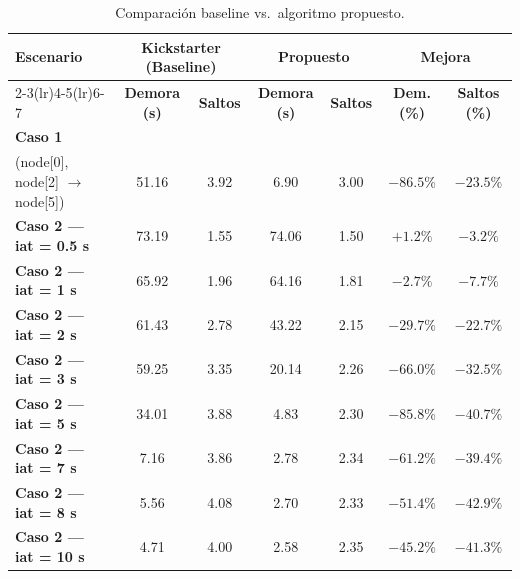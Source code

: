 \documentclass[10pt,letterpaper,twocolumn]{article}
\begin{document}
\begin{table}[!t]
  \centering
  \caption{Comparación baseline vs.\ algoritmo propuesto.}
  \label{tab:comparacion}
  \begin{tabular}{@{}lcccccc@{}}
    \toprule
    \multirow{2}{*}{\textbf{Escenario}} &
    \multicolumn{2}{c}{\textbf{Kickstarter (Baseline)}} &
    \multicolumn{2}{c}{\textbf{Propuesto}} &
    \multicolumn{2}{c}{\textbf{Mejora}} \\
    \cmidrule(lr){2-3}\cmidrule(lr){4-5}\cmidrule(lr){6-7}
    & \textbf{Demora (s)} & \textbf{Saltos} & \textbf{Demora (s)} & \textbf{Saltos} & \textbf{Dem. (\%)} & \textbf{Saltos (\%)} \\
    \midrule
    \textbf{Caso 1} & & & & & & \\
    \quad (node[0], node[2] $\to$ node[5]) & 51.16 & 3.92 & 6.90 & 3.00 & $-86.5\%$ & $-23.5\%$ \\
    \textbf{Caso 2 — iat = 0.5 s} & 73.19 & 1.55 & 74.06 & 1.50 & $+1.2\%$ & $-3.2\%$ \\
    \textbf{Caso 2 — iat = 1 s}   & 65.92 & 1.96 & 64.16 & 1.81 & $-2.7\%$ & $-7.7\%$ \\
    \textbf{Caso 2 — iat = 2 s}   & 61.43 & 2.78 & 43.22 & 2.15 & $-29.7\%$ & $-22.7\%$ \\
    \textbf{Caso 2 — iat = 3 s}   & 59.25 & 3.35 & 20.14 & 2.26 & $-66.0\%$ & $-32.5\%$ \\
    \textbf{Caso 2 — iat = 5 s}   & 34.01 & 3.88 & 4.83  & 2.30 & $-85.8\%$ & $-40.7\%$ \\
    \textbf{Caso 2 — iat = 7 s}   & 7.16  & 3.86 & 2.78  & 2.34 & $-61.2\%$ & $-39.4\%$ \\
    \textbf{Caso 2 — iat = 8 s}   & 5.56  & 4.08 & 2.70  & 2.33 & $-51.4\%$ & $-42.9\%$ \\
    \textbf{Caso 2 — iat = 10 s}  & 4.71  & 4.00 & 2.58  & 2.35 & $-45.2\%$ & $-41.3\%$ \\
    \bottomrule
  \end{tabular}
\end{table}
\end{document}
